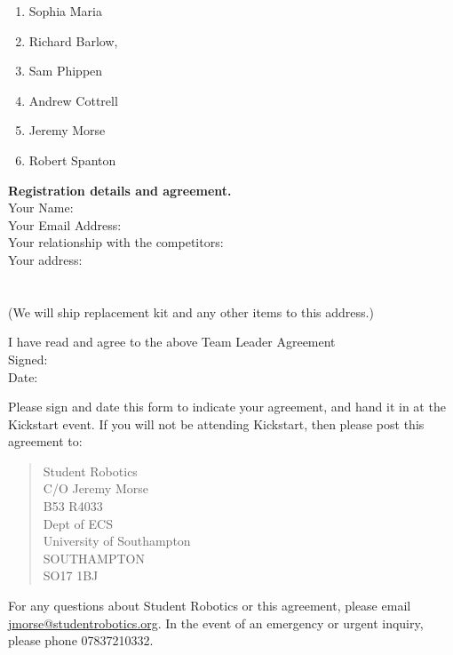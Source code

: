 \documentclass[a4paper, 11pt]{scrartcl}
\begin{document}
\begin{enumerate}
\item Sophia Maria
\item Richard Barlow,
\item Sam Phippen
\item Andrew Cottrell
\item Jeremy Morse
\item Robert Spanton
\end{enumerate}

\noindent
\textbf{Registration details and agreement.} \\
\doublespacing
\noindent
Your Name:\hrulefill\\
Your Email Address:\hrulefill\\
Your relationship with the competitors:\hrulefill\\
Your address:\hrulefill\\
\hbox{}\hrulefill\\
\hbox{}\hrulefill\\
(We will ship replacement kit and any other items to this address.)

\noindent
\dotfill\hfill

\noindent
I have read and agree to the above Team Leader Agreement\\
Signed:\hrulefill\\
Date:\hrulefill\\

\singlespacing

\noindent
Please sign and date this form to indicate your agreement, and hand it in at
the Kickstart event. If you will not be attending Kickstart, then please post
this agreement to:
\begin{quote}
       Student Robotics \\
       C/O Jeremy Morse \\
       B53 R4033 \\
       Dept of ECS \\
       University of Southampton \\
       SOUTHAMPTON \\
       SO17 1BJ
\end{quote}

For any questions about Student Robotics or this agreement, please email
\url{jmorse@studentrobotics.org}. In the event of an emergency or urgent
inquiry, please phone 07837210332.
\end{document}
